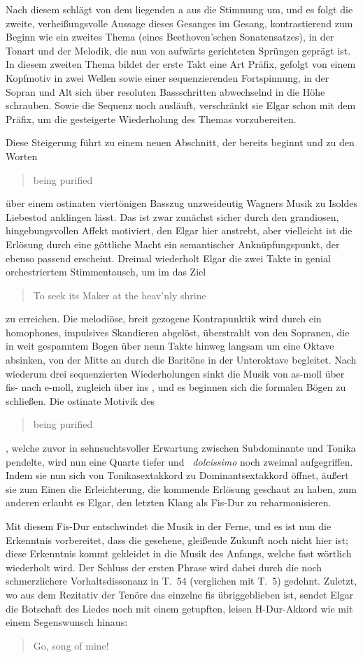 \documentclass[a4paper,11pt,open=any]{scrbook}
\newcommand{\engquote}[1]{\foreignblockquote{english}{#1}}
\begin{document}
Nach diesem schlägt von dem liegenden a aus die Stimmung um, und es folgt die
zweite, verheißungsvolle Aussage dieses Gesanges im Gesang, kontrastierend
zum Beginn wie ein zweites Thema (eines Beethoven’schen Sonatensatzes), in
der Tonart und der Melodik, die nun von aufwärts gerichteten Sprüngen geprägt
ist.  In diesem zweiten Thema bildet der erste Takt eine Art Präfix, gefolgt
von einem Kopfmotiv in zwei Wellen sowie einer sequenzierenden Fortspinnung,
in der Sopran und Alt sich über resoluten Bassschritten abwechselnd in die
Höhe schrauben.  Sowie die Sequenz noch ausläuft, verschränkt sie Elgar schon
mit dem Präfix, um die gesteigerte Wiederholung des Themas vorzubereiten.

Diese Steigerung führt zu einem neuen Abschnitt, der 
bereits beginnt und zu den Worten \engquote{being purified} über einem
ostinaten viertönigen Basszug unzweideutig Wagners Musik zu Isoldes
Liebestod anklingen lässt.\cite[p.~553]{moore}  Das ist zwar zunächst
sicher durch den grandiosen, hingebungsvollen Affekt motiviert, den Elgar
hier anstrebt, aber vielleicht ist die Erlösung durch eine göttliche Macht
ein semantischer Anknüpfungspunkt, der ebenso passend erscheint.  Dreimal
wiederholt Elgar die zwei Takte in genial orchestriertem Stimmentausch, um
im  das Ziel \engquote{To seek its Maker at the heav’nly
shrine} zu erreichen.  Die melodiöse, breit gezogene Kontrapunktik wird
durch ein homophones, impulsives Skandieren abgelöst, überstrahlt von den
Sopranen, die in weit gespanntem Bogen über neun Takte hinweg langsam um
eine Oktave absinken, von der Mitte an durch die Baritöne in der Unteroktave
begleitet.  Nach wiederum drei sequenzierten Wiederholungen sinkt die Musik
von as-moll über fis- nach e-moll, zugleich über  ins
, und es beginnen sich die formalen Bögen zu schließen.
Die ostinate Motivik des \engquote{being purified}, welche zuvor in
sehnsuchtsvoller Erwartung zwischen Subdominante und Tonika pendelte,
wird nun eine Quarte tiefer und ~\textit{dolcissimo}
noch zweimal aufgegriffen.  Indem sie nun sich von Tonikasextakkord zu
Dominantsextakkord öffnet, äußert sie zum Einen die Erleichterung, die
kommende Erlösung geschaut zu haben, zum anderen erlaubt es Elgar, den
letzten Klang als Fis-Dur zu reharmonisieren.

Mit diesem Fis-Dur entschwindet die Musik in der Ferne, und es ist nun die
Erkenntnis vorbereitet, dass die gesehene, gleißende Zukunft noch nicht hier
ist; diese Erkenntnis kommt gekleidet in die Musik des Anfangs, welche fast
wörtlich wiederholt wird.  Der Schluss der ersten Phrase wird dabei durch
die noch schmerzlichere Vorhaltsdissonanz in T.~54 (verglichen mit T.~5)
gedehnt.  Zuletzt, wo aus dem Rezitativ der Tenöre das einzelne \textsf{fis}
übriggeblieben ist, sendet Elgar die Botschaft des Liedes noch mit einem
getupften, leisen H-Dur-Akkord wie mit einem Segenswunsch hinaus:
\engquote{Go, song of mine!}
\end{document}
